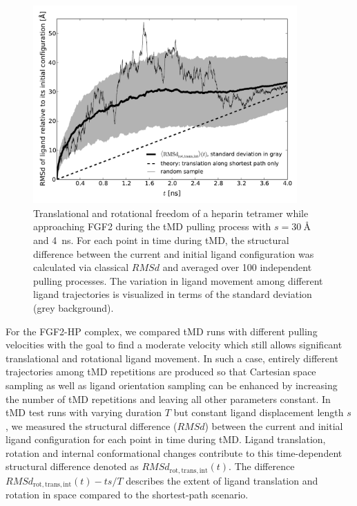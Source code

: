 \begin{figure}
\centering
\includegraphics[width=0.9\textwidth]{gfx/dmd/figure_2_freedom_over_time_100samples_avg_stddev_randomone_pub_003.pdf}
\caption[]{
Translational and rotational freedom of a heparin tetramer while approaching
FGF2 during the tMD pulling process with $s=\SI{30}{\angstrom}$ and
\SI{4}{\nano\second}. For each point in time during tMD, the structural difference
between the current and initial ligand configuration was calculated via
classical $RMSd$ and averaged over 100 independent pulling processes. The
variation in ligand movement among different ligand trajectories is visualized
in terms of the standard deviation (grey background).
}
\label{fig:dmd:sampling}
\end{figure}



For the FGF2-HP complex, we compared tMD runs with different pulling velocities
with the goal to find a moderate velocity which still allows significant
translational and rotational ligand movement. In such a case, entirely different
trajectories among tMD repetitions are produced so that Cartesian space sampling
as well as ligand orientation sampling can be enhanced by increasing the number
of tMD repetitions and leaving all other parameters constant. In tMD test runs
with varying duration $T$ but constant ligand displacement length $s$, we
measured the structural difference ($RMSd$) between the current and initial
ligand configuration for each point in time during tMD. Ligand translation,
rotation and internal conformational changes contribute to this time-dependent
structural difference denoted as $RMSd_{\mathrm{rot,trans,int}}(t)$.  The
difference $RMSd_{\mathrm{rot,trans,int}}(t) - ts/T$ describes the extent of
ligand translation and rotation in space compared to the shortest-path scenario.

